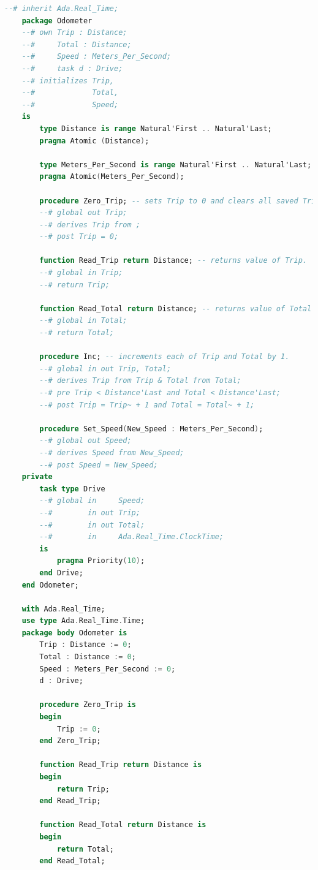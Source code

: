 \begin{lstlisting}[language=ada, frame=single, gobble=0, caption={Multitasking Odometer}]
	--# inherit Ada.Real_Time;
	package Odometer
	--# own Trip : Distance;
	--#     Total : Distance;
	--#     Speed : Meters_Per_Second;
	--#     task d : Drive;
	--# initializes Trip, 
	--#             Total,
	--#             Speed;
	is
	    type Distance is range Natural'First .. Natural'Last;
	    pragma Atomic (Distance);
	    
	    type Meters_Per_Second is range Natural'First .. Natural'Last;
	    pragma Atomic(Meters_Per_Second);
	    
	    procedure Zero_Trip; -- sets Trip to 0 and clears all saved Trip marks.
	    --# global out Trip;
	    --# derives Trip from ;
	    --# post Trip = 0;
	    
	    function Read_Trip return Distance; -- returns value of Trip.
	    --# global in Trip;
	    --# return Trip;
	    
	    function Read_Total return Distance; -- returns value of Total
	    --# global in Total;
	    --# return Total;
	    
	    procedure Inc; -- increments each of Trip and Total by 1.
	    --# global in out Trip, Total;
	    --# derives Trip from Trip & Total from Total;
	    --# pre Trip < Distance'Last and Total < Distance'Last;
	    --# post Trip = Trip~ + 1 and Total = Total~ + 1;

	    procedure Set_Speed(New_Speed : Meters_Per_Second);
	    --# global out Speed;
	    --# derives Speed from New_Speed;
	    --# post Speed = New_Speed;                             
	private    	    
	    task type Drive
	    --# global in     Speed;
	    --#        in out Trip;
	    --#        in out Total;
	    --#        in     Ada.Real_Time.ClockTime;
	    is
	        pragma Priority(10);
	    end Drive;	    
	end Odometer;

	with Ada.Real_Time;
	use type Ada.Real_Time.Time;
	package body Odometer is
	    Trip : Distance := 0;
	    Total : Distance := 0;
	    Speed : Meters_Per_Second := 0;
	    d : Drive;
	    
	    procedure Zero_Trip is
	    begin
	        Trip := 0;
	    end Zero_Trip;
	    
	    function Read_Trip return Distance is
	    begin
	        return Trip;
	    end Read_Trip;
	    
	    function Read_Total return Distance is
	    begin
	        return Total;
	    end Read_Total;
	    

\end{lstlisting}
